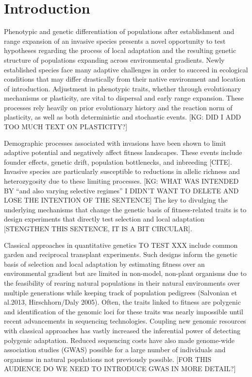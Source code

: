 \documentclass[smallextended]{svjour3}
\begin{document}
\flushbottom
\maketitle
\thispagestyle{empty}

\linenumbers%

\section*{Introduction}


Phenotypic and genetic differentiation of populations after establishment and
range expansion of an invasive species presents a novel opportunity to test
hypotheses regarding the process of local adaptation and the resulting genetic
structure of populations expanding across environmental gradients. Newly
established species face many adaptive challenges in order to succeed in
ecological conditions that may differ drastically from their native environment
and location of introduction. Adjustment in phenotypic traits, whether through
evolutionary mechanisms or plasticity, are vital to dispersal and early range
expansion. These processes rely heavily on prior evolutionary history and the
reaction norm of plasticity, as well as both deterministic and stochastic
events. [KG: DID I ADD TOO MUCH TEXT ON PLASTICITY?]

Demographic processes associated with invasions have been shown to limit
adaptive potential and negatively affect fitness landscapes. These events
include founder effects, genetic drift, population bottlenecks, and inbreeding
[CITE].  Invasive species are particularly susceptible to reductions in allelic
richness and heterozygosity due to these limiting processes. [KG: WHAT WAS
INTENDED BY ``and also varying selective regimes'' I DIDN'T WANT TO DELETE AND
LOSE THE INTENTION OF THE SENTENCE]  The key to divulging the underlying
mechanisms that change the genetic basis of fitness-related traits is to design
experiments that directly test selection and local adaptation [STENGTHEN THIS
SENTENCE, IT IS A BIT CIRCULAR].

Classical approaches in quantitative genetics TO TEST XXX include common garden
and reciprocal transplant experiments. Such designs inform the genetic basis of
selection and local adaptation by estimating fitness over an environmental
gradient but are limited in non-model, non-plant organisms due to the
feasibility of rearing natural populations in their natural environments over
multiple generations while keeping track of population pedigrees (Salvonian et
al.2013, Hirschhorn/Daly 2005). Often, the traits linked to fitness are
polygenic and identification of the genomic loci for these traits was nearly
impossible until recent advancements in sequencing technologies. Coupling new
genomic resources with classical approaches has vastly increased the inferential
power of detecting polygenic adaptation. Reduced sequencing costs have also made
genome-wide association studies (GWAS) possible for a large number of
individuals and organisms in natural populations not previously possible. [FOR
THIS AUDIENCE DO WE NEED TO INTRODUCE GWAS IN MORE DETAIL?]
\end{document}
